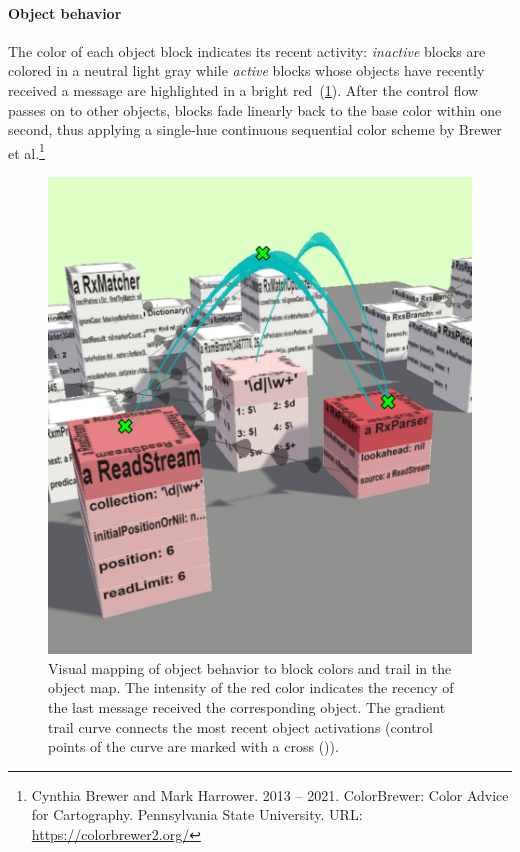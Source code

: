\paragraph{Object behavior}
\label{sec:visualization_approach/mapping/object_behavior}

The color of each object block indicates its recent activity:
\emph{inactive} blocks are colored in a neutral light gray while \emph{active} blocks whose objects have recently received a message are highlighted in a bright red~(\cref{fig:visualization_approach/mapping/object_behavior}).
After the control flow passes on to other objects, blocks fade linearly back to the base color within one second, thus applying a single-hue continuous sequential color scheme by Brewer et al.\footnote{Cynthia Brewer and Mark Harrower. 2013 -- 2021. ColorBrewer: Color Advice for Cartography. Pennsylvania State University. \textsc{URL}: \url{https://colorbrewer2.org/}}

\begin{figure}
	\includegraphics[width=\linewidth]{sections/03_visualization_approach/mapping/object_behavior}
	\caption{
		Visual mapping of object behavior to block colors and trail in the object map.
		The intensity of the red color indicates the recency of the last message received the corresponding object.
		The gradient trail curve connects the most recent object activations (control points of the curve are marked with a cross (\protect{})).
	}
	\label{fig:visualization_approach/mapping/object_behavior}
\end{figure}

